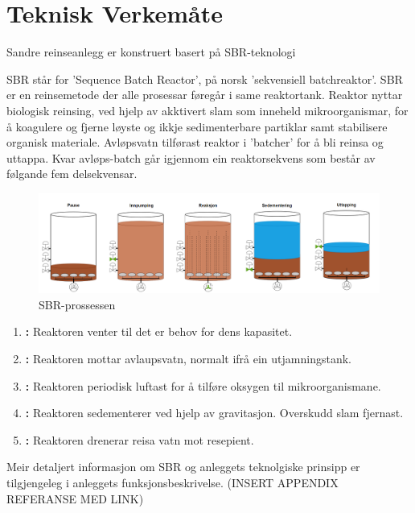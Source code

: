 \newpage
\section{Teknisk Verkemåte}
\thispagestyle{fancy}
Sandre reinseanlegg er konstruert basert på SBR-teknologi

\gls{SBR} står for 'Sequence Batch Reactor', på norsk 'sekvensiell batchreaktor'.\newline
\gls{SBR} er en reinsemetode der alle prosessar føregår i same reaktortank. 
Reaktor nyttar biologisk reinsing, ved hjelp av akktivert slam som inneheld mikroorganismar, for å koagulere 
og fjerne løyste og ikkje sedimenterbare partiklar samt stabilisere organisk materiale. 
Avløpsvatn tilførast reaktor i 'batcher' for å bli reinsa og uttappa. 
Kvar avløps-batch går igjennom ein reaktorsekvens som består av følgande fem delsekvensar.
\newline

\begin{figure}[htbp]
    \centering
    \includegraphics[width=1\textwidth]{Figurar/SBR-V2.png}
    \caption{\gls{SBR}-prossessen}\label{fig:SBR-Prosessen}
\end{figure}


\begin{enumerate}
    \item \textbf{:} Reaktoren venter til det er behov for dens kapasitet.
    \item \textbf{:} Reaktoren mottar avlaupsvatn, normalt ifrå ein utjamningstank.
    \item \textbf{:} Reaktoren periodisk luftast for å tilføre oksygen til mikroorganismane.
    \item \textbf{:} Reaktoren sedementerer ved hjelp av gravitasjon. Overskudd slam fjernast.
    \item \textbf{:} Reaktoren drenerar reisa vatn mot resepient.
\end{enumerate}

Meir detaljert informasjon om \gls{SBR} og anleggets teknolgiske prinsipp er tilgjengeleg i anleggets
funksjonsbeskrivelse. (INSERT APPENDIX REFERANSE MED LINK)

